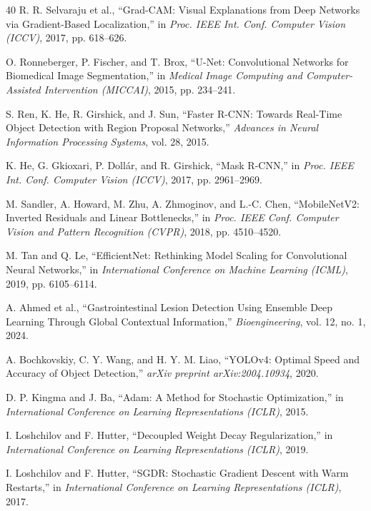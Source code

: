 \documentclass[conference]{IEEEtran}
\begin{document}
\begin{thebibliography}{40}
R. R. Selvaraju et al., ``Grad-CAM: Visual Explanations from Deep Networks via Gradient-Based Localization,'' in \emph{Proc. IEEE Int. Conf. Computer Vision (ICCV)}, 2017, pp. 618--626.

O. Ronneberger, P. Fischer, and T. Brox, ``U-Net: Convolutional Networks for Biomedical Image Segmentation,'' in \emph{Medical Image Computing and Computer-Assisted Intervention (MICCAI)}, 2015, pp. 234--241.

S. Ren, K. He, R. Girshick, and J. Sun, ``Faster R-CNN: Towards Real-Time Object Detection with Region Proposal Networks,'' \emph{Advances in Neural Information Processing Systems}, vol. 28, 2015.

K. He, G. Gkioxari, P. Doll{\'a}r, and R. Girshick, ``Mask R-CNN,'' in \emph{Proc. IEEE Int. Conf. Computer Vision (ICCV)}, 2017, pp. 2961--2969.

M. Sandler, A. Howard, M. Zhu, A. Zhmoginov, and L.-C. Chen, ``MobileNetV2: Inverted Residuals and Linear Bottlenecks,'' in \emph{Proc. IEEE Conf. Computer Vision and Pattern Recognition (CVPR)}, 2018, pp. 4510--4520.

M. Tan and Q. Le, ``EfficientNet: Rethinking Model Scaling for Convolutional Neural Networks,'' in \emph{International Conference on Machine Learning (ICML)}, 2019, pp. 6105--6114.

A. Ahmed et al., ``Gastrointestinal Lesion Detection Using Ensemble Deep Learning Through Global Contextual Information,'' \emph{Bioengineering}, vol. 12, no. 1, 2024.

A. Bochkovskiy, C. Y. Wang, and H. Y. M. Liao, ``YOLOv4: Optimal Speed and Accuracy of Object Detection,'' \emph{arXiv preprint arXiv:2004.10934}, 2020.

D. P. Kingma and J. Ba, ``Adam: A Method for Stochastic Optimization,'' in \emph{International Conference on Learning Representations (ICLR)}, 2015.

I. Loshchilov and F. Hutter, ``Decoupled Weight Decay Regularization,'' in \emph{International Conference on Learning Representations (ICLR)}, 2019.

I. Loshchilov and F. Hutter, ``SGDR: Stochastic Gradient Descent with Warm Restarts,'' in \emph{International Conference on Learning Representations (ICLR)}, 2017.


\end{thebibliography}
\end{document}
